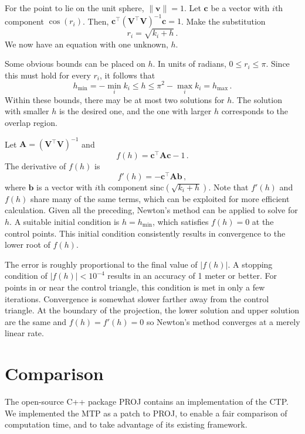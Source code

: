 \documentclass[]{interact}
\begin{document}
For the point to lie on the unit sphere, $\|\mathbf v\| = 1$. Let $\mathbf c$
be a vector with $i$th component $\cos\left(r_i \right)$. Then,
$\mathbf c^\top \left(\mathbf V^\top \mathbf V\right )^{-1} \mathbf c = 1$.
Make the substitution
\begin{equation}\label{eq:inverser}
  r_i = \sqrt{k_i + h} \,.
\end{equation} We now have an equation with one unknown, $h$.

Some obvious bounds can be placed on $h$. In units of radians,
$0 \le r_i \le \pi$. Since this must hold for every $r_i$, it follows that
\begin{equation}
   h_{\min} = -\min_i k_i \le h \le \pi^2 - \max_i k_i = h_{\max}\,.
\end{equation}
Within these bounds, there may be at most two solutions for $h$. The solution
with smaller $h$ is the desired one, and the one with larger $h$ corresponds to
the overlap region.

Let $\mathbf A = \left(\mathbf V^\top \mathbf V\right )^{-1}$ and
\begin{equation}\label{eq:inversefh}
f(h) = \mathbf c^\top \mathbf A \mathbf c - 1 \,.
\end{equation}
The derivative of $f(h)$ is
\begin{equation}\label{eq:inversefph}
  f'(h) = -\mathbf c^\top \mathbf A \mathbf b \,,
\end{equation}
where $\mathbf b$ is a vector with $i$th component
$\mathrm{sinc}\left(\sqrt{k_i + h}\right)$.
Note that $f'(h)$ and $f(h)$ share many of the same terms, which can be
exploited for more efficient calculation. Given all the preceding, Newton's
method can be applied to solve for $h$. A suitable initial condition is
$h = h_{\min}$, which satisfies $f(h) = 0$ at the control points. This initial
condition consistently results in convergence to the lower root of $f(h)$.

The error is roughly proportional to the final value of $|f(h)|$. A stopping
condition of $|f(h)| < 10^{-4}$ results in an accuracy of 1 meter or better.
For points in or near the control triangle, this condition is met in only a
few iterations. Convergence is somewhat slower farther away from the
control triangle. At the boundary of the projection,
the lower solution and upper solution are the same and $f(h)=f'(h)=0$
so Newton's method converges at a merely linear rate. \citep{burden}

\section{Comparison}
The open-source C++ package PROJ \citep{proj} contains an implementation of the
CTP. We implemented the MTP as a patch to PROJ, to enable a fair comparison of
computation time, and to take advantage of its existing framework.
\end{document}

